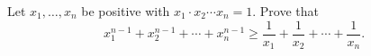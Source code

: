 Let $x_1, \ldots, x_n$ be positive with $x_1 \cdot x_2 \cdots x_n = 1$. Prove that
\[ x_1^{n-1} + x_2^{n-1} + \cdots + x_n^{n-1} \geq \frac{1}{x_1} + \frac{1}{x_2} + \cdots + \frac{1}{x_n}. \]
